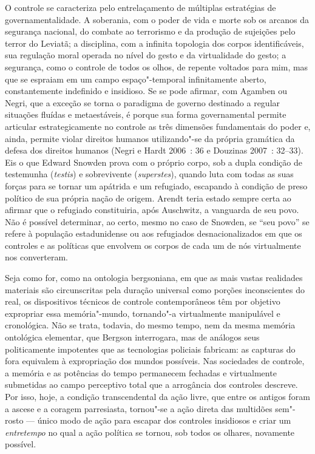 O controle se caracteriza pelo entrelaçamento de múltiplas estratégias
de governamentalidade. A soberania, com o poder de vida e morte sob os
arcanos da segurança nacional, do combate ao terrorismo e da produção de
sujeições pelo terror do Leviatã; a disciplina, com a infinita topologia
dos corpos identificáveis, sua regulação moral operada no nível do gesto
e da virtualidade do gesto; a segurança, como o controle de todos os
olhos, de repente voltados para mim, mas que se espraiam em um campo
espaço"-temporal infinitamente aberto, constantemente indefinido e
insidioso. Se se pode afirmar, com Agamben ou Negri, que a exceção se
torna o paradigma de governo destinado a regular situações fluídas e
metaestáveis, é porque sua forma governamental permite articular
estrategicamente no controle as três dimensões fundamentais do poder e,
ainda, permite violar direitos humanos utilizando"-se da própria
gramática da defesa dos direitos humanos (Negri e Hardt 2006~: 36 e
Douzinas 2007~: 32--33). Eis o que Edward Snowden prova com o próprio
corpo, sob a dupla condição de testemunha (\emph{testis}) e sobrevivente
(\emph{superstes}), quando luta com todas as suas forças para se tornar
um apátrida e um refugiado, escapando à condição de preso político de
sua própria nação de origem. Arendt teria estado sempre certa ao afirmar
que o refugiado constituiria, após Auschwitz, a vanguarda de seu povo.
Não é possível determinar, ao certo, mesmo no caso de Snowden, se ``seu
povo'' se refere à população estadunidense ou aos refugiados
desnacionalizados em que os controles e as políticas que envolvem os
corpos de cada um de nós virtualmente nos converteram.

Seja como for, como na ontologia bergsoniana, em que as mais vastas
realidades materiais são circunscritas pela duração universal como
porções inconscientes do real, os dispositivos técnicos de controle
contemporâneos têm por objetivo expropriar essa memória"-mundo,
tornando"-a virtualmente manipulável e cronológica. Não se trata,
todavia, do mesmo tempo, nem da mesma memória ontológica elementar, que
Bergson interrogara, mas de análogos seus politicamente impotentes que
as tecnologias policiais fabricam: as capturas do fora equivalem à
expropriação dos mundos possíveis. Nas sociedades de controle, a memória
e as potências do tempo permanecem fechadas e virtualmente submetidas ao
campo perceptivo total que a arrogância dos controles descreve. Por
isso, hoje, a condição transcendental da ação livre, que entre os
antigos foram a ascese e a coragem parresiasta, tornou"-se a ação direta
das multidões sem"-rosto --- único modo de ação para escapar dos controles
insidiosos e criar um \emph{entretempo} no qual a ação política se
tornou, sob todos os olhares, novamente possível.

